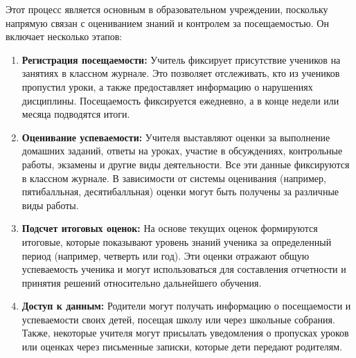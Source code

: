 \documentclass[a4paper, final]{article}
\begin{document}
Этот процесс является основным в образовательном учреждении, поскольку напрямую связан с оцениванием знаний и контролем за посещаемостью. Он включает несколько этапов:
\begin{enumerate}
  \item \textbf{Регистрация посещаемости:} Учитель фиксирует присутствие учеников на занятиях в классном журнале. Это позволяет отслеживать, кто из учеников пропустил уроки, а также предоставляет информацию о нарушениях дисциплины. Посещаемость фиксируется ежедневно, а в конце недели или месяца подводятся итоги.

  \item \textbf{Оценивание успеваемости:} Учителя выставляют оценки за выполнение домашних заданий, ответы на уроках, участие в обсуждениях, контрольные работы, экзамены и другие виды деятельности. Все эти данные фиксируются в классном журнале. В зависимости от системы оценивания (например, пятибалльная, десятибалльная) оценки могут быть получены за различные виды работы.
  
  \item \textbf{Подсчет итоговых оценок:} На основе текущих оценок формируются итоговые, которые показывают уровень знаний ученика за определенный период (например, четверть или год). Эти оценки отражают общую успеваемость ученика и могут использоваться для составления отчетности и принятия решений относительно дальнейшего обучения.
  
  \item \textbf{Доступ к данным:} Родители могут получать информацию о посещаемости и успеваемости своих детей, посещая школу или через школьные собрания. Также, некоторые учителя могут присылать уведомления о пропусках уроков или оценках через письменные записки, которые дети передают родителям.
\end{enumerate}
\end{document}
